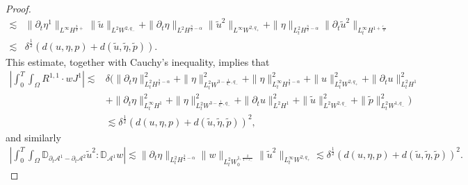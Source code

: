 \documentclass[letterpaper,reqno,10pt,twoside]{amsart}
\theoremstyle{definition}
\theoremstyle{remark}
\def\p{\partial}
\begin{document}
\begin{proof}
\[\begin{aligned}
				\lesssim&\|\p_{t}\eta^{1}\|_{L^{\infty}H^{\frac{3}{2}+}}\|\tilde{u}\|_{L^{2}W^{2,q_{-}}}+\|\p_{t}\eta\|_{L^{2}H^{\frac{3}{2}-\alpha}}\|\tilde{u}^{2}\|_{L^{\infty}W^{2,q_{+}}}+\|\eta\|_{L_{t}^{2}H^{\frac{3}{2}-\alpha}}\|\p_{t}\tilde{u}^{2}\|_{L_{t}^{\infty}H^{1+\frac{\varepsilon_{-}}{2}}}\\
				\lesssim&\delta^{\frac{1}{2}}(d(u,\eta,p)+d(\tilde{u},\tilde{\eta},\tilde{p})).
			\end{aligned}
			\]
			\noindent This estimate, together with Cauchy's inequality, implies that
			\[
			\begin{aligned}
				|\int_{0}^{T}\int_{\Omega}R^{1,1}\cdot wJ^{1}|\lesssim& \delta \bigg(\|\p_{t}\eta\|_{L_{t}^{2}H^{\frac{3}{2}-\alpha}}^{2}+\|\eta\|_{L_{t}^{2}W^{3-\frac{1}{q_{-}},q_{-}}}^{2}+\|\eta\|_{L_{t}^{\infty}H^{\frac{3}{2}-\alpha}}^{2}+\|u\|_{L_{t}^{2}W^{2,q_{+}}}^{2}+\|\p_{t}u\|_{L_{t}^{2}H^{1}}^{2}\\
				&+\|\p_{t}\eta\|_{L_{t}^{\infty}H^{1}}^{2}+\|\eta\|_{L_{t}^{2}W^{3-\frac{1}{q_{-}},q_{-}}}^{2}+\|\p_{t}u\|_{L^{2}H^{1}}^{2}+\|\tilde{u}\|_{L^{2}W^{2,q_{-}}}^{2}+\|\tilde{p}\|_{L_{t}^{2}W^{1,q_{-}}}^{2}\bigg)\\
				&\lesssim\delta^{\frac{1}{2}}(d(u,\eta,p)+d(\tilde{u},\tilde{\eta},\tilde{p}))^{2},
			\end{aligned}
			\]
			and similarly
			\[
			\begin{aligned}
				|\int_{0}^{T}\int_{\Omega}\mathbb{D}_{\p_{t}\mathcal{A}^{1}-\p_{t}\mathcal{A}^{2}}\tilde{u}^{2}:\mathbb{D}_{\mathcal{A}^{1}}w|\lesssim \|\p_{t}\eta\|_{L_{t}^{2}H^{\frac{3}{2}-\alpha}}\|w\|_{L_{t}^{2}W_{0}^{1,\frac{2}{1-\varepsilon_{-}}}}\|\tilde{u}^{2}\|_{L_{t}^{\infty}W^{2,q_{+}}}\lesssim \delta^{\frac{1}{2}}(d(u,\eta,p)+d(\tilde{u},\tilde{\eta},\tilde{p}))^{2}.
			\end{aligned}
			\]
			

\end{proof}
\end{document}
